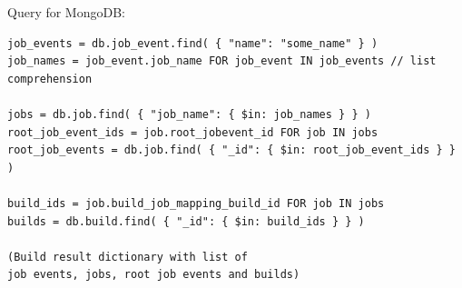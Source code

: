 Query for MongoDB:
\begin{verbatim}
job_events = db.job_event.find( { "name": "some_name" } )
job_names = job_event.job_name FOR job_event IN job_events // list comprehension

jobs = db.job.find( { "job_name": { $in: job_names } } )
root_job_event_ids = job.root_jobevent_id FOR job IN jobs
root_job_events = db.job.find( { "_id": { $in: root_job_event_ids } } )

build_ids = job.build_job_mapping_build_id FOR job IN jobs
builds = db.build.find( { "_id": { $in: build_ids } } )

(Build result dictionary with list of 
job events, jobs, root job events and builds)
 
\end{verbatim}







